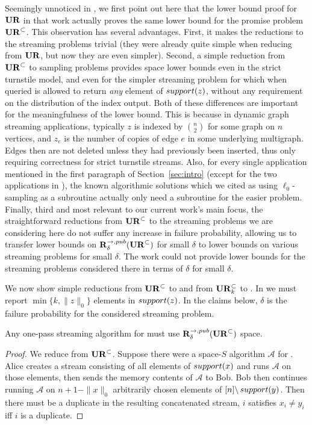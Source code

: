 Seemingly unnoticed in \cite{JowhariST11}, we first point out here that the lower bound proof for $\mathbf{UR}$ in that work actually proves the same lower bound for the promise problem $\mathbf{UR}^\subset$. This observation has several advantages. First, it makes the reductions to the streaming problems trivial (they were already quite simple when reducing from $\mathbf{UR}$, but now they are even simpler). Second, a simple reduction from $\mathbf{UR}^\subset$ to sampling problems provides space lower bounds even in the strict turnstile model, and even for the simpler {\em \suppfind{}} streaming problem for which when queried is allowed to return {\em any} element of $\mathop{support}(z)$, without any requirement on the distribution of the index output. Both of these differences are important for the meaningfulness of the lower bound. This is because in dynamic graph streaming applications, typically $z$ is indexed by $\binom{n}{2}$ for some graph on $n$ vertices, and $z_e$ is the number of copies of edge $e$ in some underlying multigraph. Edges then are not deleted unless they had previously been inserted, thus only requiring correctness for strict turnstile streams. Also, for every single application mentioned in the first paragraph of Section~\ref{sec:intro} (except for the two applications in \cite{FrahlingIS08}), the known algorithmic solutions which we cited as using $\ell_0$-sampling as a subroutine actually only need a subroutine for the easier \suppfind{} problem. Finally, third and most relevant to our current work's main focus, the straightforward reductions from $\mathbf{UR}^\subset$ to the streaming problems we are considering here do not suffer any increase in failure probability, allowing us to transfer lower bounds on $\mathbf{R}^{\rightarrow,pub}_{\delta}(\mathbf{UR}^\subset)$ for small $\delta$ to lower bounds on various streaming problems for small $\delta$. The work \cite{JowhariST11} could not provide lower bounds for the streaming problems considered there in terms of $\delta$ for small $\delta$.

We now show simple reductions from $\mathbf{UR}^\subset$ to  and from $\mathbf{UR}_k^\subset$ to . In  we must report $\min\{k,\|z\|_0\}$ elements in $\mathop{support}(z)$. In the claims below, $\delta$ is the failure probability for the considered streaming problem.

\begin{claim}
Any one-pass streaming algorithm for  must use $\mathbf{R}^{\rightarrow,pub}_{\delta}(\mathbf{UR}^\subset)$ space.
\end{claim}
\begin{proof}
  We reduce from $\mathbf{UR}^\subset$. Suppose there were a space-$S$ algorithm $\mathcal{A}$ for . Alice creates a stream consisting of all elements of $\mathop{support}(x)$ and runs $\mathcal{A}$ on those elements, then sends the memory contents of $\mathcal{A}$ to Bob. Bob then continues running $\mathcal{A}$ on $n+1-\|x\|_0$ arbitrarily chosen elements of $[n]\backslash\mathop{support}(y)$. Then there must be a duplicate in the resulting concatenated stream, $i$ satisfies $x_i\neq y_i$ iff $i$ is a duplicate.
\end{proof}

